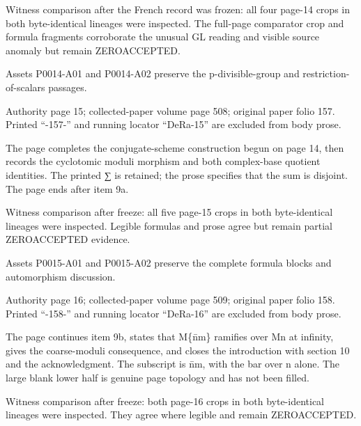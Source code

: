 \documentclass[11pt,a4paper]{article}
\begin{document}
Witness comparison after the French record was frozen: all four page-14 crops in both byte-identical lineages were inspected. The full-page comparator crop and formula fragments corroborate the unusual GL reading and visible source anomaly but remain ZERO\textunderscore{}ACCEPTED.

Assets P0014-A01 and P0014-A02 preserve the p-divisible-group and restriction-of-scalars passages.


\par\medskip
\hypertarget{D018-P0015}{}
\par\smallskip
Authority page 15; collected-paper volume page 508; original paper folio 157. Printed “-157-” and running locator “DeRa-15” are excluded from body prose.

The page completes the conjugate-scheme construction begun on page 14, then records the cyclotomic moduli morphism and both complex-base quotient identities. The printed ∑ is retained; the prose specifies that the sum is disjoint. The page ends after item 9a.

Witness comparison after freeze: all five page-15 crops in both byte-identical lineages were inspected. Legible formulas and prose agree but remain partial ZERO\textunderscore{}ACCEPTED evidence.

Assets P0015-A01 and P0015-A02 preserve the complete formula blocks and automorphism discussion.


\par\medskip
\hypertarget{D018-P0016}{}
\par\smallskip
Authority page 16; collected-paper volume page 509; original paper folio 158. Printed “-158-” and running locator “DeRa-16” are excluded from body prose.

The page continues item 9b, states that M\textunderscore{}\{n̄m\} ramifies over M\textunderscore{}n at infinity, gives the coarse-moduli consequence, and closes the introduction with section 10 and the acknowledgment. The subscript is n̄m, with the bar over n alone. The large blank lower half is genuine page topology and has not been filled.

Witness comparison after freeze: both page-16 crops in both byte-identical lineages were inspected. They agree where legible and remain ZERO\textunderscore{}ACCEPTED.
\end{document}
